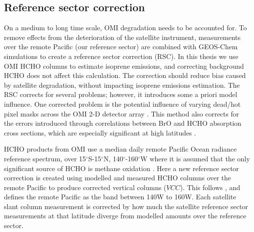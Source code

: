     
  \subsection{Reference sector correction}
    \label{Model:omiRecalc:RSC}
    
    On a medium to long time scale, OMI degradation needs to be accounted for.
    To remove effects from the deterioration of the satellite instrument, measurements over the remote Pacific (our reference sector) are combined with GEOS-Chem simulations to create a reference sector correction (RSC).
    In this thesis we use OMI HCHO columns to estimate isoprene emissions, and correcting background HCHO does not affect this calculation.
    The correction should reduce bias caused by satellite degradation, without impacting isoprene emissions estimation.
    The RSC corrects for several problems; however, it introduces some a priori model influence.
    One corrected problem is the potential influence of varying dead/hot pixel masks across the OMI 2-D detector array \parencite{DeSmedt2015}.
    This method also corrects for the errors introduced through correlations between BrO and HCHO absorption cross sections, which are especially significant at high latitudes \parencite{Abad2015}.
    
    HCHO products from OMI use a median daily remote Pacific Ocean radiance reference spectrum, over 15$^{\circ}$S-15$^{\circ}$N, 140$^{\circ}$-160$^{\circ}$W where it is assumed that the only significant source of HCHO is methane oxidation \parencite{DeSmedt2008,Barkley2013,Kurosu2014}.
    Here a new reference sector correction is created using modelled and measured HCHO columns over the remote Pacific to produce corrected vertical columns ($VCC$).
    This follows \textcite{Abad2016}, and defines the remote Pacific as the band between 140{\degr}W to 160{\degr}W.
    Each satellite slant column measurement is corrected by how much the satellite reference sector measurements at that latitude diverge from modelled amounts over the reference sector.
    

